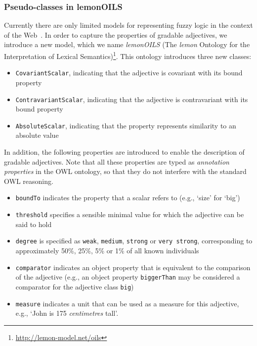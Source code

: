 \documentclass[11pt]{article}
\begin{document}
\subsubsection{Pseudo-classes in lemonOILS}

Currently there are only limited models for representing fuzzy 
logic in the context of the Web~\cite{zhao2008uncertainty}. In order to capture the 
properties of gradable adjectives, we introduce a new model, which we name 
\emph{lemonOILS} (The \emph{lemon} Ontology for the Interpretation of Lexical Semantics)\footnote{\url{http://lemon-model.net/oils}}. This ontology introduces three 
new classes:

\begin{itemize}[noitemsep]
	\item {\tt CovariantScalar}, indicating that the adjective is covariant with its bound property
	\item {\tt ContravariantScalar}, indicating that the adjective is contravariant with its bound property
	\item {\tt AbsoluteScalar}, indicating that the property represents similarity to an absolute value
\end{itemize}

In addition, the following properties are introduced to enable the description 
of gradable adjectives. Note that all these properties are typed as 
\emph{annotation properties} in the OWL ontology, so that they do not interfere 
with the standard OWL reasoning.

\begin{itemize}[noitemsep]
	\item {\tt boundTo} indicates the property that a scalar refers to (e.g., `size' for `big')
	\item {\tt threshold} specifies a sensible minimal value for which the adjective can be said to hold
	\item {\tt degree} is specified as {\tt weak}, {\tt medium}, {\tt strong} or {\tt very strong}, corresponding to approximately 50\%, 25\%, 5\% or 1\% of all known individuals
	\item {\tt comparator} indicates an object property that is equivalent to the comparison of the adjective (e.g., an object property {\tt biggerThan} may be considered a comparator for the adjective class {\tt big})
	\item {\tt measure} indicates a unit that can be used as a measure for this adjective, e.g., `John is 175 \textit{centimetres} tall'.
\end{itemize}
\end{document}
